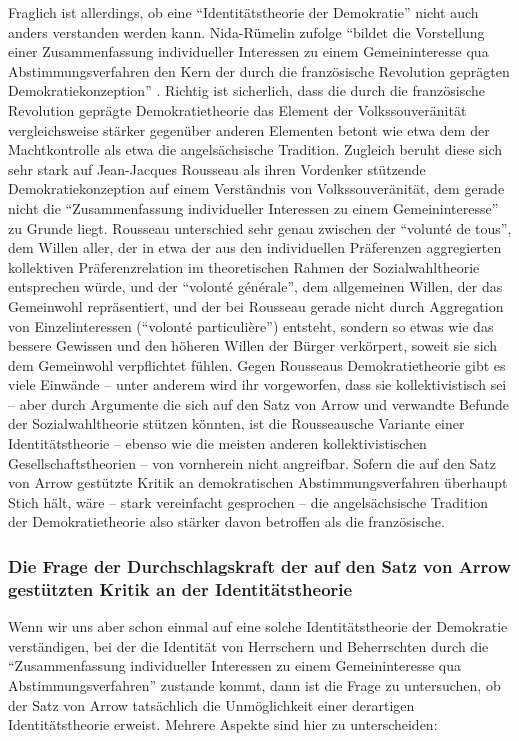 Fraglich ist allerdings, ob eine "`Identitätstheorie der Demokratie"' nicht
auch anders verstanden werden kann. Nida-Rümelin zufolge "`bildet die
Vorstellung einer Zusammenfassung individueller Interessen zu einem
Gemeininteresse qua Abstimmungsverfahren den Kern der durch die französische
Revolution geprägten Demokratiekonzeption"' \cite[S. 191]{nida-ruemelin:1991}. 
Richtig ist sicherlich, dass die durch die französische Revolution geprägte
Demokratietheorie das Element der Volkssouveränität vergleichsweise stärker
gegenüber anderen Elementen betont wie etwa dem der Machtkontrolle als etwa die
angelsächsische Tradition. Zugleich beruht diese sich sehr stark auf
Jean-Jacques Rousseau als ihren Vordenker stützende Demokratiekonzeption auf
einem Verständnis von Volkssouveränität, dem gerade nicht die "`Zusammenfassung
individueller Interessen zu einem Gemeininteresse"' zu Grunde liegt. Rousseau
unterschied sehr genau zwischen der "`volunté de tous"', dem Willen aller, der
in etwa der aus den individuellen Präferenzen aggregierten kollektiven
Präferenzrelation im theoretischen Rahmen der Sozialwahltheorie entsprechen
würde, und der "`volonté générale"', dem allgemeinen Willen, der das Gemeinwohl
repräsentiert, und der bei Rousseau gerade nicht durch Aggregation von
Einzelinteressen ("`volonté particulière"') entsteht, sondern so etwas wie das
bessere Gewissen und den höheren Willen der Bürger verkörpert, soweit sie
sich dem Gemeinwohl verpflichtet fühlen. Gegen Rousseaus Demokratietheorie gibt
es viele Einwände \cite[S. 103ff.]{schmidt:2000} -- unter anderem wird ihr
vorgeworfen, dass sie kollektivistisch sei -- aber durch Argumente die sich auf
den Satz von Arrow und verwandte Befunde der Sozialwahltheorie stützen könnten,
ist die Rousseausche Variante einer Identitätstheorie -- ebenso wie die
meisten anderen kollektivistischen Gesellschaftstheorien -- von vornherein nicht
angreifbar. Sofern die auf den Satz von Arrow gestützte Kritik an
demokratischen Abstimmungsverfahren überhaupt Stich hält, wäre -- stark
vereinfacht gesprochen -- die angelsächsische Tradition der Demokratietheorie
also stärker davon betroffen als die französische.

\subsubsection{Die Frage der Durchschlagskraft der auf den Satz von Arrow
gestützten Kritik an der Identitätstheorie} Wenn wir uns aber schon einmal auf
eine solche Identitätstheorie der Demokratie verständigen, bei der die Identität
von Herrschern und Beherrschten durch die "`Zusammenfassung individueller
Interessen zu einem Gemeininteresse qua Abstimmungsverfahren"' \cite[S.
191]{nida-ruemelin:1991} zustande kommt, dann ist die Frage zu untersuchen, ob
der Satz von Arrow tatsächlich die Unmöglichkeit einer derartigen
Identitätstheorie erweist. Mehrere Aspekte sind hier zu unterscheiden:

